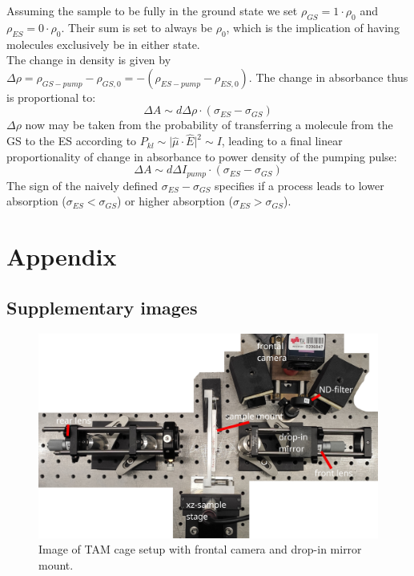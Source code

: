 \documentclass[twoside,openright]{scrreprt}
\begin{document}
{Assuming the sample to be fully in the ground state we set $\rho _{GS} = 1\cdot \rho_0$ and $\rho_{ES} = 0 \cdot \rho_0$. Their sum is set to always be $\rho_0$, which is the implication of having molecules exclusively be in either state.\\
The change in density is given by $\Delta \rho = \rho_{GS-pump} - \rho_{GS,0} = - \left(\rho_{ES-pump} - \rho_{ES,0}\right)$. The change in absorbance thus is proportional to:
\begin{equation}
\Delta A \sim d \Delta \rho\cdot\left(\sigma_{ES}-\sigma_{GS}\right)
\end{equation}
$\Delta \rho$ now may be taken from the probability of transferring a molecule from the GS to the ES according to $P_{kl}\sim \lvert\hat{\mu}\cdot\hat{E}\rvert^2 \sim I$, leading to a final linear proportionality of change in absorbance to power density of the pumping pulse:
\begin{equation}
\Delta A \sim d \Delta I_{pump}\cdot\left(\sigma_{ES}-\sigma_{GS}\right)
\end{equation}
The sign of the naively defined $\sigma_{ES} - \sigma_{GS}$ specifies if a process leads to lower absorption ($\sigma_{ES} < \sigma_{GS}$) or higher absorption ($\sigma_{ES} > \sigma_{GS}$).

\chapter{Appendix}
\section*{Supplementary images}
\begin{figure}[hbtp]
\centering
\includegraphics[width=0.6\linewidth]{images/TAM/CroppedTAM_setup.jpg}
\caption{Image of TAM cage setup with frontal camera and drop-in mirror mount.}
\end{figure}

}
\end{document}
